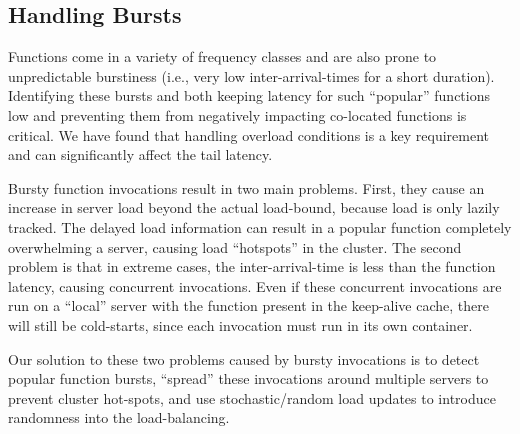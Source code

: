 \subsection{Handling Bursts}
\label{subsec:bursty}

Functions come in a variety of frequency classes and are also prone to unpredictable burstiness (i.e., very low inter-arrival-times for a short duration). 
Identifying these bursts and both keeping latency for such ``popular'' functions low and preventing them from negatively impacting co-located functions is critical.
We have found that handling overload conditions is a key requirement and can significantly affect the tail latency.

Bursty function invocations result in two main problems.
First, they cause an increase in server load beyond the actual load-bound, because load is only lazily tracked.
The delayed load information can result in a popular function completely overwhelming a server, causing load ``hotspots'' in the cluster.
The second problem is that in extreme cases, the inter-arrival-time is less than the function latency, causing concurrent invocations.
Even if these concurrent invocations are run on a ``local'' server with the function present in the keep-alive cache, there will still be cold-starts, since each invocation must run in its own container. 

Our solution to these two problems caused by bursty invocations is to detect popular function bursts, ``spread'' these invocations around multiple servers to prevent cluster hot-spots, and use stochastic/random load updates to introduce randomness into the load-balancing. 

\begin{comment}
Multiple problems. 1. Increase the load beyond the bound because lazily tracked. 2. Concurrent: no warm starts. Spreading them around will be useful. 

The problem of concurrent invocations is vexing even with locality, since containers may be in use and thus results in cold-starts for these invocations. In the worst case we must accept $n-1$ cold starts for an $n$ core server. 

We use two strategies:
1. Identify popular functions in a low-overhead online manner.
1a. Use this information to inform the load estimate. Due to the problem of \textbf{stale loads.}
2. Extreme overload: pick least loaded server if going around the horn.  %

This is similar to epsilon-greedy: we greedily pick the server based on the expected running time estimate for unpopular functions and probabilistically for popular functions. 
The probability is determined based on the server load and the noise in the server load estimate, which in turn depends on the estimate of the recent arrival rate of the functions. 

\end{comment}

